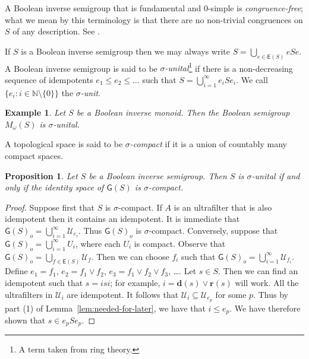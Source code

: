 \documentclass[a4paper]{amsart}
\newtheorem{example}[theorem]{Example}
\newtheorem{proposition}[theorem]{Proposition}
\begin{document}
A Boolean inverse semigroup that is fundamental and $0$-simple is {\em congruence-free};
what we mean by this terminology is that there are no non-trivial congruences on $S$ 
of any description. 
See \cite{Lawson1998}.

If $S$ is a Boolean inverse semigroup then we may always write $S = \bigcup_{e \in \mathsf{E}(S)} eSe$.
A Boolean inverse semigroup is said to be {\em $\sigma$-unital}\footnote{A term taken 
from ring theory.} if there is a non-decreasing sequence of idempotents $e_{1} \leq e_{2} \leq \ldots$ 
such that $S = \bigcup_{i=1}^{\infty} e_{i}Se_{i}$. 
We call $\{e_{i} \colon i \in \mathbb{N} \setminus \{0\}\}$ the {\em $\sigma$-unit}.

\begin{example}{\em Let $S$ be a Boolean inverse monoid.
Then the Boolean semigroup $M_{\omega}(S)$ is $\sigma$-unital.}
\end{example}

A topological space is said to be {\em $\sigma$-compact} 
if it is a union of countably many compact spaces.

\begin{proposition} Let $S$ be a Boolean inverse semigroup.
Then $S$ is $\sigma$-unital if and only if the identity space of $\mathsf{G}(S)$ is
$\sigma$-compact.
\end{proposition}
\begin{proof} Suppose first that $S$ is $\sigma$-compact.
If $A$ is an ultrafilter that is also idempotent then it contains an idempotent.
It is immediate that  $\mathsf{G}(S)_{o} = \bigcup_{i=1}^{\infty} \mathscr{U}_{e_{i}}$.
Thus $\mathsf{G}(S)_{o}$ is $\sigma$-compact.
Conversely, suppose that  $\mathsf{G}(S)_{o} = \bigcup_{i=1}^{\infty} U_{i}$,
where each $U_{i}$ is compact.
Observe that  $\mathsf{G}(S)_{o} = \bigcup_{f \in \mathsf{E}(S)} \mathscr{U}_{f}$.
Then we can choose $f_{i}$ such that $\mathsf{G}(S)_{o} = \bigcup_{i=1}^{\infty} \mathscr{U}_{f_{i}}$.
Define $e_{1} = f_{1}$, $e_{2} = f_{1} \vee f_{2}$, $e_{3} = f_{1} \vee f_{2} \vee f_{3}$, \ldots.
Let $s \in S$.
Then we can find an idempotent such that $s = isi$;
for example, $i = \mathbf{d}(s) \vee \mathbf{r}(s)$ will work.
All the ultrafilters in $\mathscr{U}_{i}$ are idempotent.
It follows that $\mathscr{U}_{i} \subseteq \mathscr{U}_{e_{p}}$ for some $p$.
Thus by part (1) of Lemma~\ref{lem:needed-for-later},
we have that $i \leq e_{p}$.
We have therefore shown that $s \in e_{p}Se_{p}$.
\end{proof}
\end{document}
